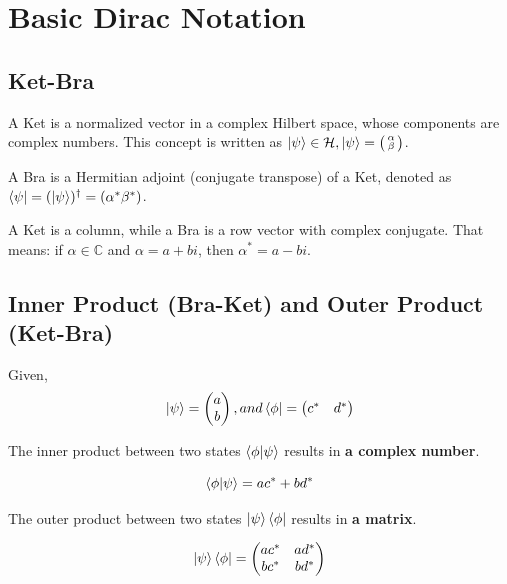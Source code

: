 \documentclass[11pt]{article}
\begin{document}
    \section*{Basic Dirac Notation}

    \subsection{Ket-Bra}\label{subsec:ket-bra}
    \indent A Ket is a normalized vector in a complex Hilbert space, whose components are complex numbers.
    This concept is written as $\ket{\psi} \in \mathcal{H}, \ket{\psi} = \bigl( \begin{smallmatrix}
                                                                                    \alpha \\ \beta
    \end{smallmatrix} \bigr) $.

    A Bra is a Hermitian adjoint (conjugate transpose) of a Ket, denoted as $\bra{\psi} = (\ket{\psi})^\dagger = (\alpha^* \beta^*)$.

    A Ket is a column, while a Bra is a row vector with complex conjugate.
    That means: if $\alpha \in \mathbb{C}$ and $\alpha = a + bi$, then $\alpha^* = a - bi$.

    \subsection{Inner Product (Bra-Ket) and Outer Product (Ket-Bra)}\label{subsec:inner-product-and-outer-product}

    Given,
    \[
        \ket{\psi} = \begin{pmatrix} a \\ b \end{pmatrix}, and \bra{\phi} = \begin{pmatrix} c^* & d^* \end{pmatrix}
    \]

    The inner product between two states $\braket{\phi|\psi}$ results in \textbf{a complex number}.

    \[
        \braket{\phi|\psi} = a c^* + b d^*
    \]

    The outer product between two states $\ket{\psi}\bra{\phi}$ results in \textbf{a matrix}.

    \[
        \ket{\psi}\bra{\phi} = \begin{pmatrix} ac^* & ad^* \\ bc^* & bd^* \end{pmatrix}
    \]
\end{document}
